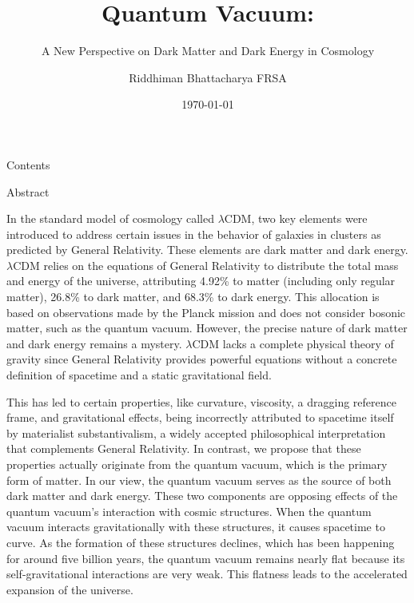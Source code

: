 \documentclass[aspectratio=169,xcolor=dvipsnames, t]{beamer}
\title[short title]{Quantum Vacuum:} %
\subtitle{A New
Perspective on Dark Matter and Dark
Energy in Cosmology
}
\author[Bhattacharya]{Riddhiman Bhattacharya FRSA}
\institute[]{KASHIWA DARK MATTER SYMPOSIUM 2023}
\date{\today}
\begin{document}
\maketitlepage

\begin{frame}[t]{Contents}
    \tableofcontents
\end{frame}
\begin{frame} {Abstract}

 In the standard model of cosmology called $\lambda$CDM, two key elements were introduced to address certain issues in the behavior of galaxies in clusters as predicted by General Relativity. These elements are dark matter and dark energy.$\lambda$CDM relies on the equations of General Relativity to distribute the total mass and energy
of the universe, attributing 4.92\% to matter (including only regular matter), 26.8\% to dark matter, and 68.3\% to dark energy. This allocation is based on observations made by the Planck mission and does not consider bosonic matter, such as the quantum vacuum.
However, the precise nature of dark matter and dark energy remains a mystery. $\lambda$CDM lacks a complete physical theory of gravity since General Relativity provides powerful equations without a concrete definition of spacetime and a static gravitational field. 

\end{frame}
\begin{frame}{}
\vspace{0.5cm}
This has led to certain properties, like curvature, viscosity, a dragging reference frame, and gravitational effects, being incorrectly attributed to spacetime itself by materialist substantivalism, a widely accepted philosophical interpretation that complements General Relativity.
    In contrast, we propose that these properties actually originate from the quantum vacuum, which is the primary form of matter. In our view, the quantum vacuum serves as the source of both dark matter and dark energy. These two components are opposing effects of the quantum vacuum’s interaction with cosmic structures. When the quantum vacuum interacts gravitationally with these structures, it causes spacetime to curve. As the formation of these structures declines, which has been happening for around five billion years, the quantum vacuum remains nearly flat because its self-gravitational interactions are very weak. This flatness
leads to the accelerated expansion of the universe.
\end{frame}
\end{document}
